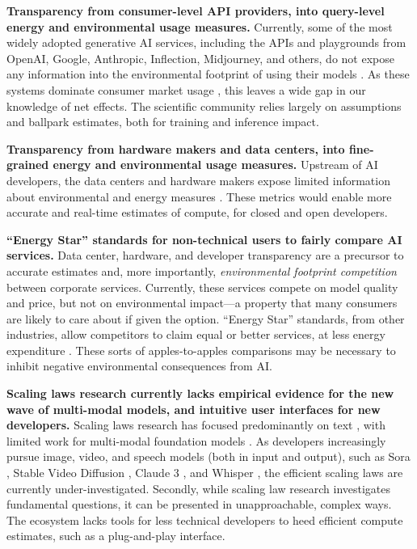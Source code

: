 \textbf{Transparency from consumer-level API providers, into query-level energy and environmental usage measures.}
Currently, some of the most widely adopted generative AI services, including the APIs and playgrounds from OpenAI, Google, Anthropic, Inflection, Midjourney, and others, do not expose any information into the environmental footprint of using their models \citep{bommasani2023foundation}.
As these systems dominate consumer market usage \citep{korinek2023market}, this leaves a wide gap in our knowledge of net effects.
The scientific community relies largely on assumptions and ballpark estimates, both for training and inference impact.

\textbf{Transparency from hardware makers and data centers, into fine-grained energy and environmental usage measures.}
Upstream of AI developers, the data centers and hardware makers expose limited information about environmental and energy measures \citep{luccioni2023estimating}.
These metrics would enable more accurate and real-time estimates of compute, for closed and open developers.


\textbf{``Energy Star'' standards for non-technical users to fairly compare AI services.}
Data center, hardware, and developer transparency are a precursor to accurate estimates and, more importantly, \textit{environmental footprint competition} between corporate services.
Currently, these services compete on model quality and price, but not on environmental impact---a property that many consumers are likely to care about if given the option.
``Energy Star'' standards, from other industries, allow competitors to claim equal or better services, at less energy expenditure \citep{brown2002status}.
These sorts of apples-to-apples comparisons may be necessary to inhibit negative environmental consequences from AI.

\textbf{Scaling laws research currently lacks empirical evidence for the new wave of multi-modal models, and intuitive user interfaces for new developers.}
Scaling laws research has focused predominantly on text \citep{kaplan2020scaling, hoffmann2022training, muennighoff2023scaling, gadre2024language}, with limited work for multi-modal foundation models \citep{aghajanyan2023scaling}. As developers increasingly pursue image, video, and speech models (both in input and output), such as Sora \citep{sora2024}, Stable Video Diffusion \citep{blattmann2023stable}, Claude 3 \citep{claude3}, and Whisper \citep{radford2023robust}, the efficient scaling laws are currently under-investigated.
Secondly, while scaling law research investigates fundamental questions, it can be presented in unapproachable, complex ways.
The ecosystem lacks tools for less technical developers to heed efficient compute estimates, such as a plug-and-play interface.